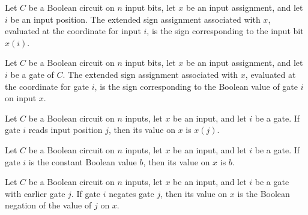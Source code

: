 \begin{theorem}
\label{FABL.BooleanCircuit.cnfAssignment_inputCoordinate}
\leanok
{}
Let $C$ be a Boolean circuit on $n$ input bits, let $x$ be an input assignment, and let
$i$ be an input position. The extended sign assignment associated with $x$, evaluated at
the coordinate for input $i$, is the sign corresponding to the input bit $x(i)$.
\end{theorem}

\begin{theorem}
\label{FABL.BooleanCircuit.cnfAssignment_gateCoordinate}
\leanok
{}
Let $C$ be a Boolean circuit on $n$ input bits, let $x$ be an input assignment, and let
$i$ be a gate of $C$. The extended sign assignment associated with $x$, evaluated at the
coordinate for gate $i$, is the sign corresponding to the Boolean value of gate $i$ on
input $x$.
\end{theorem}

\begin{theorem}
\label{FABL.BooleanCircuit.evalGate_eq_input}
\leanok
{}
Let $C$ be a Boolean circuit on $n$ inputs, let $x$ be an input, and let $i$ be a gate.
If gate $i$ reads input position $j$, then its value on $x$ is $x(j)$.
\end{theorem}

\begin{theorem}
\label{FABL.BooleanCircuit.evalGate_eq_const}
\leanok
{}
Let $C$ be a Boolean circuit on $n$ inputs, let $x$ be an input, and let $i$ be a gate.
If gate $i$ is the constant Boolean value $b$, then its value on $x$ is $b$.
\end{theorem}

\begin{theorem}
\label{FABL.BooleanCircuit.evalGate_eq_neg}
\leanok
{}
Let $C$ be a Boolean circuit on $n$ inputs, let $x$ be an input, and let $i$ be a gate
with earlier gate $j$. If gate $i$ negates gate $j$, then its value on $x$ is the
Boolean negation of the value of $j$ on $x$.
\end{theorem}

